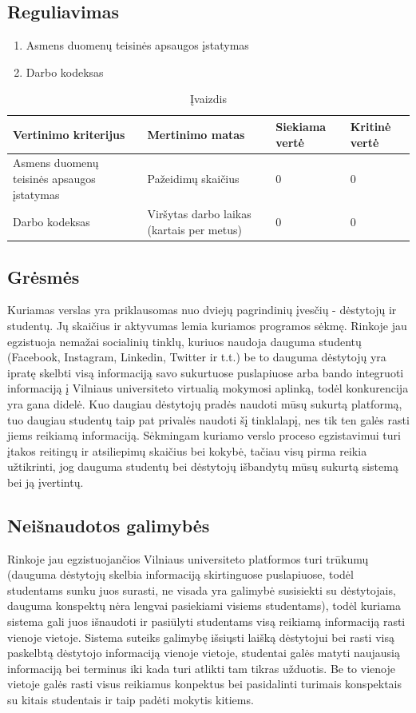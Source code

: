 \documentclass{VUMIFPSkursinis}
\begin{document}
	\subsection{Reguliavimas}
\begin{enumerate}
	\item Asmens duomenų teisinės apsaugos įstatymas
	\item Darbo kodeksas
\end{enumerate}
\begin{table}[H]
	\centering
	\caption{Įvaizdis}
	{\begin{tabular}{|p{5cm}|p{}|p{2cm}|p{2cm}|} \hline
			Vertinimo kriterijus & Mertinimo matas & Siekiama vertė & Kritinė vertė \\
			\hline
			Asmens duomenų teisinės apsaugos įstatymas & Pažeidimų skaičius & 0 & 0 \\
			\hline
			Darbo kodeksas & Viršytas darbo laikas (kartais per metus) & 0 & 0 \\
			\hline
	\end{tabular}}
	\label{reguliavimas}
\end{table}
\subsection{Grėsmės}
Kuriamas verslas yra priklausomas nuo dviejų pagrindinių įvesčių - dėstytojų ir studentų. Jų skaičius ir aktyvumas lemia kuriamos programos sėkmę. Rinkoje jau egzistuoja nemažai socialinių tinklų, kuriuos naudoja dauguma studentų (Facebook, Instagram, Linkedin, Twitter ir t.t.) be to dauguma dėstytojų yra ipratę skelbti visą informaciją savo sukurtuose puslapiuose arba bando integruoti informaciją į Vilniaus universiteto virtualią mokymosi aplinką, todėl konkurencija yra gana didelė. Kuo daugiau dėstytojų pradės naudoti mūsų sukurtą platformą, tuo daugiau studentų taip pat privalės naudoti šį tinklalapį, nes tik ten galės rasti jiems reikiamą informaciją. Sėkmingam kuriamo verslo proceso egzistavimui turi įtakos reitingų ir atsiliepimų skaičius bei kokybė, tačiau visų pirma reikia užtikrinti, jog dauguma studentų bei dėstytojų išbandytų mūsų sukurtą sistemą bei ją įvertintų.
\subsection{Neišnaudotos galimybės}
Rinkoje jau egzistuojančios Vilniaus universiteto platformos turi trūkumų (dauguma dėstytojų skelbia informaciją skirtinguose puslapiuose, todėl studentams sunku juos surasti, ne visada yra galimybė susisiekti su dėstytojais, dauguma konspektų nėra lengvai pasiekiami visiems studentams), todėl kuriama sistema gali juos išnaudoti ir pasiūlyti studentams visą reikiamą informaciją rasti vienoje vietoje. Sistema suteiks galimybę išsiųsti laišką dėstytojui bei rasti visą paskelbtą dėstytojo informaciją vienoje vietoje, studentai galės matyti naujausią informaciją bei terminus iki kada turi atlikti tam tikras užduotis. Be to vienoje vietoje galės rasti visus reikiamus konpektus bei pasidalinti turimais konspektais su kitais studentais ir taip padėti mokytis kitiems.
\newpage
\newpage
\end{document}
